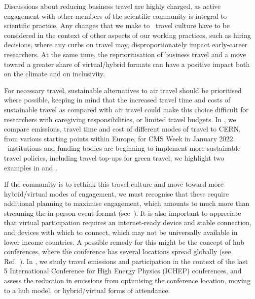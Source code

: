 \documentclass[../SustainableHEP.tex]{subfiles}
\begin{document}
Discussions about reducing business travel are highly charged, as active engagement with other members of the scientific community is integral to scientific practice. Any changes that we make to \ACR\ travel culture have to be considered in the context of other aspects of our working practices, such as hiring decisions, where any curbs on travel may, \eg disproportionately impact early-career researchers. At the same time, the reprioritisation of business travel and a move toward a greater share of virtual/hybrid formats can have a positive impact both on the climate and on inclusivity.

For necessary travel, sustainable alternatives to air travel should be prioritised where possible, keeping in mind that the increased travel time and costs of sustainable travel as compared with air travel could make this choice difficult for researchers with caregiving responsibilities, or limited travel budgets.  In , we compare emissions, travel time and cost of different modes of travel to CERN, from various starting points within Europe, for CMS Week in January 2022.  \ACR\ institutions and funding bodies are beginning to implement more sustainable travel policies, including travel top-ups for green travel; we highlight two examples in  and .

If the community is to rethink this travel culture and move toward more hybrid/virtual modes of engagement, we must recognise that these require additional planning to maximise engagement, which amounts to much more than streaming the in-person event format (see~). It is also important to appreciate that virtual participation requires an internet-ready device and stable connection, and devices with which to connect, which may not be universally available in lower income countries. A possible remedy for this might be the concept of hub conferences, where the conference has several locations spread globally (see, \eg Ref.~\cite{Parncutt}).  In , we study travel emissions and participation in the context of the last 5 International
Conference for High Energy Physics (ICHEP) conferences, and assess the reduction in emissions from optimising the conference location, moving to a hub model, or hybrid/virtual forms of attendance.

\end{document}
